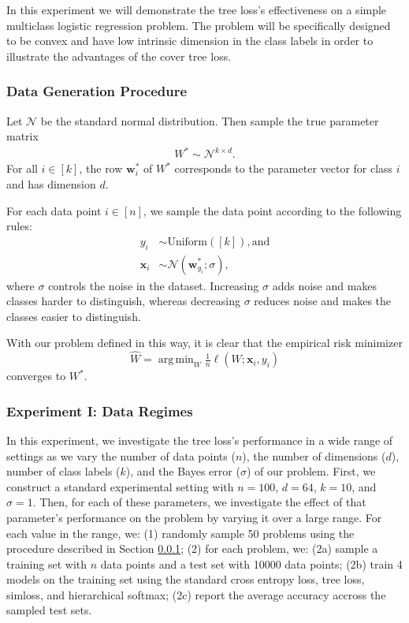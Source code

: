 \documentclass[twoside]{article}
\DeclareMathOperator*{\argmin}{arg\,min}
\renewcommand{\star}[1]{{#1}^{*}}
\newcommand{\w}{\mathbf w}
\newcommand{\x}{\mathbf x}
\begin{document}
In this experiment we will demonstrate the tree loss's effectiveness on a simple multiclass logistic regression problem.
The problem will be specifically designed to be convex and have low intrinsic dimension in the class labels in order to illustrate the advantages of the cover tree loss.

\subsubsection{Data Generation Procedure}
\label{sec:exp:synth:problem}

Let $\mathcal N$ be the standard normal distribution.
Then sample the true parameter matrix
\begin{align}
    \star W \sim \mathcal N^{k\times d}
    .
\end{align}
For all $i \in [k]$, the row $\w_i^*$ of $W^*$ corresponds to the parameter vector for class $i$ and has dimension $d$.

For each data point $i\in[n]$,
we sample the data point according to the following rules:
\begin{align}
    y_i &\sim \text{Uniform}([k]), \text{and} \\
    \x_{i} &\sim \mathcal N(\w^*_{y_i}; \sigma),
\end{align}
where $\sigma$ controls the noise in the dataset.
Increasing $\sigma$ adds noise and makes classes harder to distinguish,
whereas decreasing $\sigma$ reduces noise and makes the classes easier to distinguish.

With our problem defined in this way, it is clear that the empirical risk minimizer
\begin{equation}
    \hat W = \argmin_{W} \tfrac 1 n \ell(W; \x_i, y_i)
\end{equation}
converges to $W^*$.


\subsubsection{Experiment I: Data Regimes}

In this experiment, we investigate the tree loss's performance in a wide range of settings as we vary the number of data points ($n$), the number of dimensions ($d$), number of class labels ($k$), and the Bayes error ($\sigma$) of our problem.
First, we construct a standard experimental setting with $n=100$, $d=64$, $k=10$, and $\sigma=1$.
Then, for each of these parameters, we investigate the effect of that parameter's performance on the problem by varying it over a large range.
For each value in the range, we:
(1) randomly sample 50 problems using the procedure described in Section \ref{sec:exp:synth:problem};
(2) for each problem, we:
(2a) sample a training set with $n$ data points and a test set with 10000 data points;
(2b) train 4 models on the training set using the standard cross entropy loss, tree loss, simloss, and hierarchical softmax;
(2c) report the average accuracy accross the sampled test sets.
\end{document}
